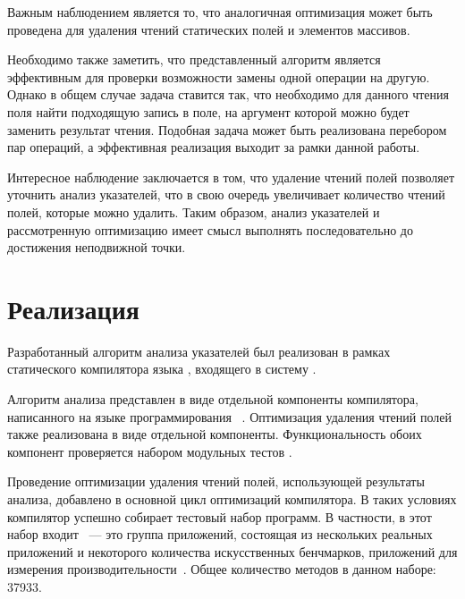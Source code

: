 \documentclass[14pt,titlepage,draft]{extarticle}
\newcommand{\java}{\eng{Java}\xspace}
\begin{document}
    Важным наблюдением является то, что аналогичная оптимизация может быть
    проведена для удаления чтений статических полей и элементов массивов.

    Необходимо также заметить, что представленный алгоритм является эффективным
    для проверки возможности замены одной операции на другую. Однако в общем
    случае задача ставится так, что необходимо для данного чтения поля найти
    подходящую запись в поле, на аргумент которой можно будет заменить
    результат чтения. Подобная задача может быть реализована перебором пар
    операций, а эффективная реализация выходит за рамки данной работы.

    Интересное наблюдение заключается в том, что удаление чтений полей позволяет
    уточнить анализ указателей, что в свою очередь увеличивает количество
    чтений полей, которые можно удалить. Таким образом, анализ указателей и
    рассмотренную оптимизацию имеет смысл выполнять последовательно до
    достижения неподвижной точки.

  \section{Реализация}

    Разработанный алгоритм анализа указателей был реализован в рамках
    статического компилятора языка \java, входящего в систему .

    Алгоритм анализа представлен в виде отдельной компоненты компилятора,
    написанного на языке программирования ~\cite{scala_lang}.
    Оптимизация удаления чтений полей также реализована в виде отдельной
    компоненты. Функциональность обоих компонент проверяется набором модульных
    тестов .

    Проведение оптимизации удаления чтений полей, использующей результаты
    анализа, добавлено в основной цикл оптимизаций компилятора.
    В таких условиях компилятор успешно собирает тестовый набор \java программ.
    В частности, в этот набор входит ~--- это группа
    приложений, состоящая из нескольких реальных приложений и некоторого
    количества искусственных бенчмарков, приложений для измерения
    производительности~\cite{spec_jvm2008}. Общее количество методов в данном
    наборе: \num{37933}.
\end{document}
